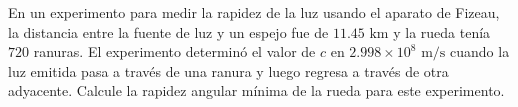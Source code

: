 \item En un experimento para medir la rapidez de la luz usando el aparato de Fizeau, la distancia entre la fuente de luz y un espejo fue de $11.45\text{ km}$ y la rueda tenía $720$ ranuras. El experimento determinó el valor de $c$ en $2.998 \times 10^8\text{ m/s}$ cuando la luz emitida pasa a través de una ranura y luego regresa a través de otra adyacente. Calcule la rapidez angular mínima de la rueda para este experimento.